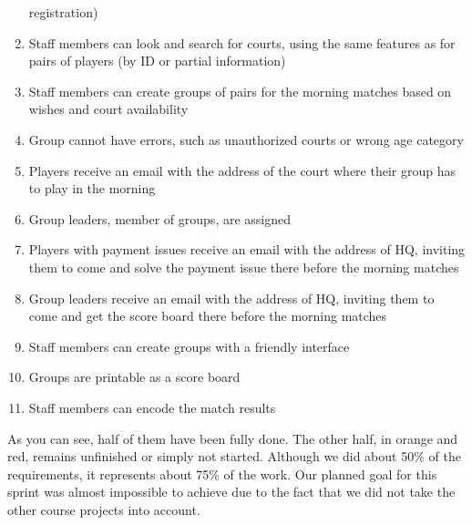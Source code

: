 \begin{enumerate}
        registration)
\color{red!80!black}
    \item Staff members can look and search for courts, using the same
        features as for pairs of players (by ID or partial information)
\color{orange!80!black}
    \item Staff members can create groups of pairs for the morning
        matches based on wishes and court availability
\color{red!80!black}
    \item Group cannot have errors, such as unauthorized courts or wrong
        age category
\color{orange!80!black}
    \item Players receive an email with the address of the court where
        their group has to play in the morning
    \item Group leaders, member of groups, are assigned
    \item Players with payment issues receive an email with the address
        of HQ, inviting them to come and solve the payment issue there
        before the morning matches
    \item Group leaders receive an email with the address of HQ,
        inviting them to come and get the score board there before the
        morning matches
    \item Staff members can create groups with a friendly interface
\color{red!80!black}
    \item Groups are printable as a score board
    \item Staff members can encode the match results
\end{enumerate}

As you can see, half of them have been fully done. The other half, in orange and red, remains unfinished or simply not started. Although we did about 50\% of the requirements, it represents about 75\% of the work. Our planned goal for this sprint was almost impossible to achieve due to the fact that we did not take the other course projects into account.